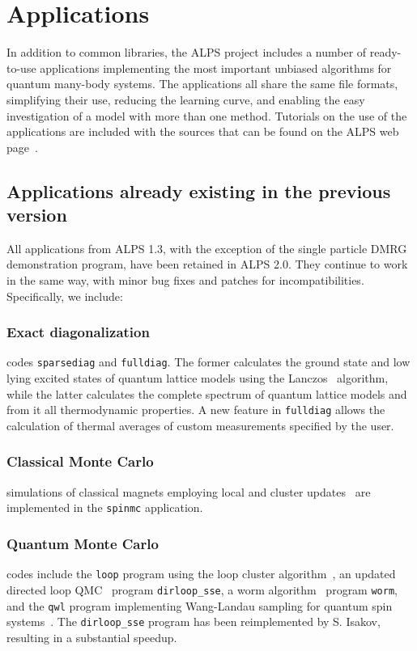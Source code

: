 \documentclass[12pt]{iopart}
\begin{document}
\section{Applications}
\label{sec:applications}
In addition to common libraries, the ALPS project includes a number of ready-to-use applications implementing the most important unbiased
algorithms for quantum many-body systems. The applications all
share the same file formats, simplifying their use, reducing the
learning curve, and enabling the easy investigation of a model with
more than one method. Tutorials on the use of the applications are
included with the sources that can be found on the ALPS web
page~\cite{alps}.

\subsection{Applications already existing in the previous version}
All applications from ALPS 1.3, with the exception of the single particle DMRG demonstration program, have been retained in ALPS 2.0. They continue to work in the same way, with minor bug fixes and patches for incompatibilities. Specifically, we include:

\subsubsection{Exact diagonalization}
codes {\tt sparsediag} and {\tt fulldiag}. The former calculates the ground state
and low lying excited states of quantum lattice models using the
Lanczos~\cite{lanczos} algorithm, while the latter calculates the complete
spectrum of quantum lattice models and from it all thermodynamic
properties. A new feature in {\tt fulldiag} allows the calculation of thermal averages of custom measurements specified by the user.



\subsubsection{Classical Monte Carlo} 
simulations of classical magnets employing local and cluster
updates~\cite{Swendsen87} are implemented in the {\tt spinmc} application.

\subsubsection{Quantum Monte Carlo} codes include the {\tt loop}  program using the loop cluster
algorithm~\cite{Evertz03,Todo01,looper}, an updated directed loop QMC~\cite{Sylyuasen,Alet2005} program {\tt dirloop\_sse}, a worm algorithm~\cite{Prokofev98A} program  {\tt worm}, and the {\tt qwl} program implementing Wang-Landau sampling for quantum spin systems~\cite{Troyer03}. The {\tt dirloop\_sse} program has been reimplemented by S. Isakov, resulting in a substantial speedup.
\end{document}

